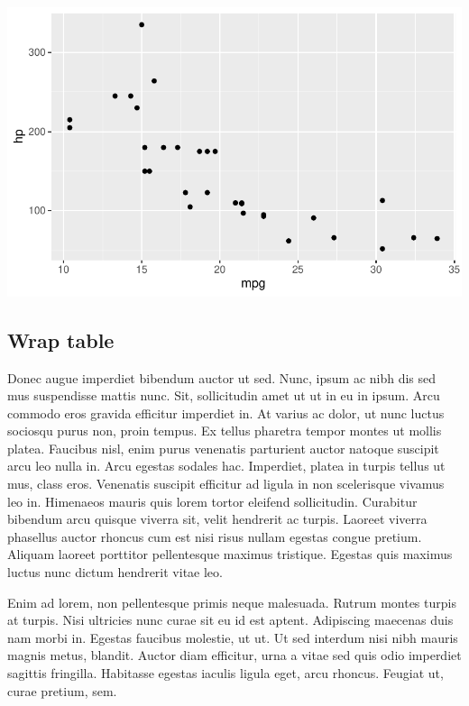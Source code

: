 \documentclass[
  9pt,
  letterpaper,
  DIV=11,
  numbers=noendperiod]{scrartcl}
\begin{document}
\includegraphics{man_files/figure-pdf/unnamed-chunk-10-1.pdf}

\newpage{}

\hypertarget{wrap-table}{%
\subsection{Wrap table}\label{wrap-table}}

Donec augue imperdiet bibendum auctor ut sed. Nunc, ipsum ac nibh dis
sed mus suspendisse mattis nunc. Sit, sollicitudin amet ut ut in eu in
ipsum. Arcu commodo eros gravida efficitur imperdiet in. At varius ac
dolor, ut nunc luctus sociosqu purus non, proin tempus. Ex tellus
pharetra tempor montes ut mollis platea. Faucibus nisl, enim purus
venenatis parturient auctor natoque suscipit arcu leo nulla in. Arcu
egestas sodales hac. Imperdiet, platea in turpis tellus ut mus, class
eros. Venenatis suscipit efficitur ad ligula in non scelerisque vivamus
leo in. Himenaeos mauris quis lorem tortor eleifend sollicitudin.
Curabitur bibendum arcu quisque viverra sit, velit hendrerit ac turpis.
Laoreet viverra phasellus auctor rhoncus cum est nisi risus nullam
egestas congue pretium. Aliquam laoreet porttitor pellentesque maximus
tristique. Egestas quis maximus luctus nunc dictum hendrerit vitae leo.

Enim ad lorem, non pellentesque primis neque malesuada. Rutrum montes
turpis at turpis. Nisi ultricies nunc curae sit eu id est aptent.
Adipiscing maecenas duis nam morbi in. Egestas faucibus molestie, ut ut.
Ut sed interdum nisi nibh mauris magnis metus, blandit. Auctor diam
efficitur, urna a vitae sed quis odio imperdiet sagittis fringilla.
Habitasse egestas iaculis ligula eget, arcu rhoncus. Feugiat ut, curae
pretium, sem.
\end{document}
